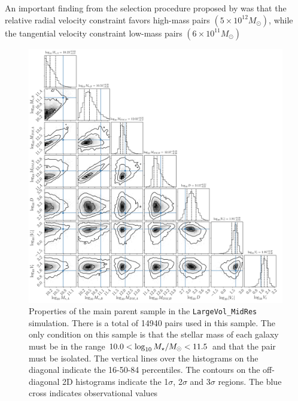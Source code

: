 \documentclass[fleqn,usenatbib]{mnras}
\begin{document}
An important finding from the selection procedure proposed by \cite{fattahi2016apostle} was that the relative radial velocity constraint favors high-mass pairs $(5\times 10^{12} M_\odot)$, while the tangential velocity constraint low-mass pairs $(6\times 10^{11} M_\odot)$







\begin{figure}
\includegraphics[scale=0.4]{full_corner_L205n2500.pdf}
\caption{\label{fig:parent_sample} 
Properties of the main parent sample in the \texttt{LargeVol\_MidRes}
simulation.
There is a total of 14940 pairs used in this sample.
The only condition on this sample is that the stellar mass of each
galaxy must be in the range $10.0<\log_{\rm 10}M_{\star}/M_{\odot}<11.5$
and that the pair must be isolated. 
The vertical lines over the histograms on the diagonal indicate the
16-50-84 percentiles.
The contours on the off-diagonal 2D histograms indicate the
1$\sigma$, 2$\sigma$ and 3$\sigma$ regions.
The blue cross indicates observational values}
\end{figure}
\end{document}
